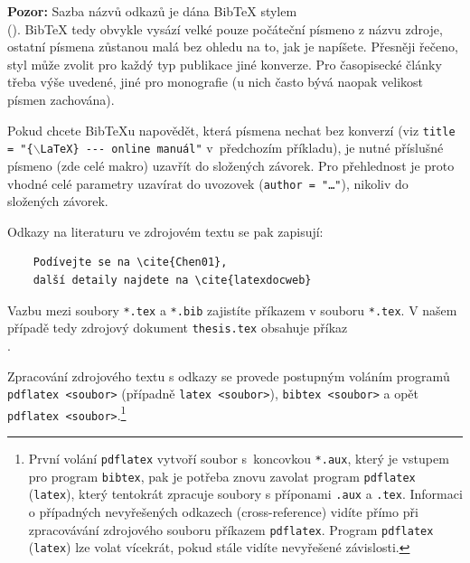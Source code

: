 \documentclass[11pt,twoside,a4paper]{book}
\begin{document}
	\textbf{Pozor:} Sazba názvů odkazů je dána Bib\TeX{} stylem\\ (\verb||). 
	Bib\TeX{} tedy obvykle vysází velké pouze počáteční písmeno z názvu zdroje, 
	ostatní písmena zůstanou malá bez ohledu na to, jak je napíšete. 
	Přesněji řečeno, styl může zvolit pro každý typ publikace jiné konverze. 
	Pro časopisecké články třeba výše uvedené, jiné pro monografie (u nich často bývá 
	naopak velikost písmen zachována).
	
	Pokud chcete Bib\TeX u napovědět, která písmena nechat bez konverzí 
	(viz \texttt{title = "\{$\backslash$LaTeX\} -{}-{}- online manuál"} 
	v~předchozím příkladu), je nutné příslušné písmeno (zde celé makro) uzavřít 
	do složených závorek. Pro přehlednost je proto vhodné celé parametry 
	uzavírat do uvozovek (\texttt{author = "\dots"}), nikoliv do složených závorek.
	
	Odkazy na literaturu ve zdrojovém textu se pak zapisují:
	\begin{verbatim}
	Podívejte se na \cite{Chen01}, 
	další detaily najdete na \cite{latexdocweb}
	\end{verbatim}
	
	Vazbu mezi soubory \verb|*.tex| a \verb|*.bib| zajistíte příkazem 
	\verb|| v souboru \verb|*.tex|.  V našem případě tedy zdrojový 
	dokument \verb|thesis.tex| obsahuje příkaz\\
	\verb||.
	
	Zpracování zdrojového textu s odkazy se provede postupným voláním programů\\
	\verb|pdflatex <soubor>| (případně \verb|latex <soubor>|), \verb|bibtex <soubor>| 
	a opět\\ \verb|pdflatex <soubor>|.\footnote{První volání \texttt{pdflatex} 
		vytvoří soubor s~koncovkou \texttt{*.aux}, který je vstupem pro program 
		\texttt{bibtex}, pak je potřeba znovu zavolat program \texttt{pdflatex} 
		(\texttt{latex}), který tentokrát zpracuje soubory s příponami \texttt{.aux} a 
		\texttt{.tex}. 
		Informaci o případných nevyřešených odkazech (cross-reference) vidíte přímo při 
		zpracovávání zdrojového souboru příkazem \texttt{pdflatex}. Program \texttt{pdflatex} 
		(\texttt{latex}) lze volat vícekrát, pokud stále vidíte nevyřešené závislosti.}
	
\end{document}

